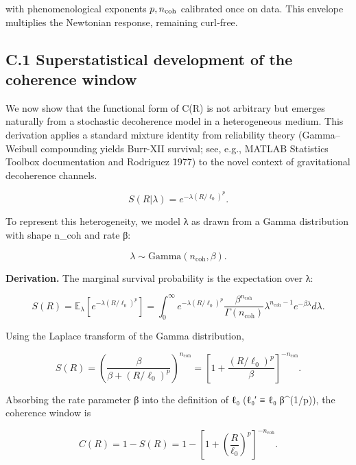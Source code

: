 \documentclass[11pt,a4paper]{article}
\begin{document}
with phenomenological exponents $p,n_{\rm coh}$ calibrated once on data. This envelope multiplies the Newtonian response, remaining curl‑free.


\subsection{C.1 Superstatistical development of the coherence window}


We now show that the functional form of C(R) is not arbitrary but emerges naturally from a stochastic decoherence model in a heterogeneous medium. This derivation applies a standard mixture identity from reliability theory (Gamma–Weibull compounding yields Burr-XII survival; see, e.g., MATLAB Statistics Toolbox documentation and Rodriguez 1977) to the novel context of gravitational decoherence channels.



\begin{equation}
S(R|\lambda) = e^{-\lambda(R/\ell_0)^p}.
\end{equation}


To represent this heterogeneity, we model λ as drawn from a Gamma distribution with shape n\_coh and rate β:


\begin{equation}
\lambda \sim \mathrm{Gamma}(n_{\mathrm{coh}}, \beta).
\end{equation}


\textbf{Derivation.} The marginal survival probability is the expectation over λ:


\begin{equation}
S(R) = \mathbb{E}_{\lambda}\left[e^{-\lambda(R/\ell_0)^p}\right] = \int_0^\infty e^{-\lambda(R/\ell_0)^p} \frac{\beta^{n_{\mathrm{coh}}}}{\Gamma(n_{\mathrm{coh}})} \lambda^{n_{\mathrm{coh}}-1} e^{-\beta\lambda} d\lambda.
\end{equation}


Using the Laplace transform of the Gamma distribution,


\begin{equation}
S(R) = \left(\frac{\beta}{\beta + (R/\ell_0)^p}\right)^{n_{\mathrm{coh}}} = \left[1 + \frac{(R/\ell_0)^p}{\beta}\right]^{-n_{\mathrm{coh}}}.
\end{equation}


Absorbing the rate parameter β into the definition of ℓ₀ (ℓ₀′ ≡ ℓ₀ β^(1/p)), the coherence window is


\begin{equation}
C(R) = 1 - S(R) = 1 - \left[1 + \left(\frac{R}{\ell_0}\right)^p\right]^{-n_{\mathrm{coh}}}.
\end{equation}
\end{document}
